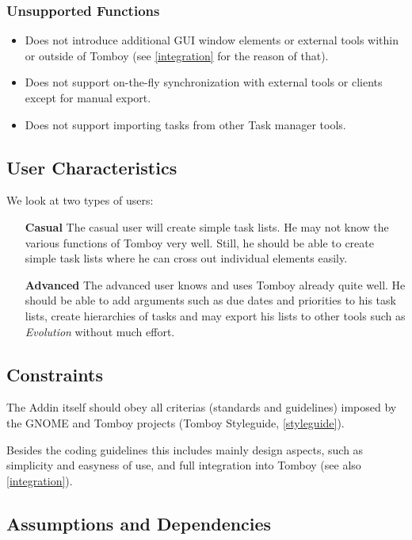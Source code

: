     \subsubsection*{Unsupported Functions}
      \label{description:functions:unsupported}
      \begin{itemize}
        \item Does not introduce additional GUI window elements or external tools within or outside of Tomboy (see \ref{integration} for the reason of that).
        \item Does not support on-the-fly synchronization with external tools or clients except for manual export.
        \item Does not support importing tasks from other Task manager tools.
      \end{itemize}

\subsection{User Characteristics}
\label{description:usercharacteristics}
We look at two types of users:

  \begin{itemize}
    \item[\bf{Casual}] The casual user will create simple task lists. He may not know the various functions of Tomboy very well. Still, he should be able to create simple task lists where he can cross out individual elements easily.

    \item[\bf{Advanced}] The advanced user knows and uses Tomboy already quite well. He should be able to add arguments such as due dates and priorities to his task lists, create hierarchies of tasks and may export his lists to other tools such as \textit{Evolution} without much effort.
  \end{itemize}


\subsection{Constraints}
\label{description:constraints}
The Addin itself should obey all criterias (standards and guidelines) imposed by the GNOME and Tomboy projects (Tomboy Styleguide, \ref{styleguide}).

Besides the coding guidelines this includes mainly design aspects, such as simplicity and easyness of use, and full integration into Tomboy (see also \ref{integration}).


\subsection{Assumptions and Dependencies}
\label{description:assumptions}
